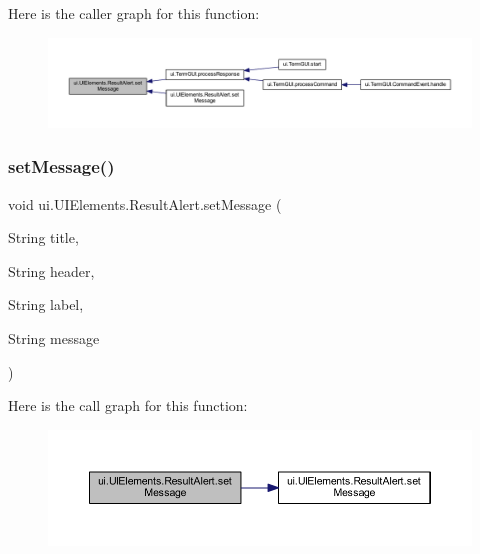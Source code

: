 Here is the caller graph for this function\+:
\nopagebreak
\begin{figure}[H]
\begin{center}
\leavevmode
\includegraphics[width=350pt]{classui_1_1_u_i_elements_1_1_result_alert_a540b3c6bfce9a590488f1b32c23cf1f5_icgraph}
\end{center}
\end{figure}
\mbox{\label{classui_1_1_u_i_elements_1_1_result_alert_a287499be420acb3e4140cfc2464d3f32}} 
\subsubsection{\texorpdfstring{set\+Message()}{setMessage()}\hspace{0.1cm}{\footnotesize\ttfamily [2/2]}}
{\footnotesize\ttfamily void ui.\+U\+I\+Elements.\+Result\+Alert.\+set\+Message (\begin{DoxyParamCaption}\item[{String}]{title,  }\item[{String}]{header,  }\item[{String}]{label,  }\item[{String}]{message }\end{DoxyParamCaption})\hspace{0.3cm}{\ttfamily [inline]}}

Here is the call graph for this function\+:
\nopagebreak
\begin{figure}[H]
\begin{center}
\leavevmode
\includegraphics[width=350pt]{classui_1_1_u_i_elements_1_1_result_alert_a287499be420acb3e4140cfc2464d3f32_cgraph}
\end{center}
\end{figure}


